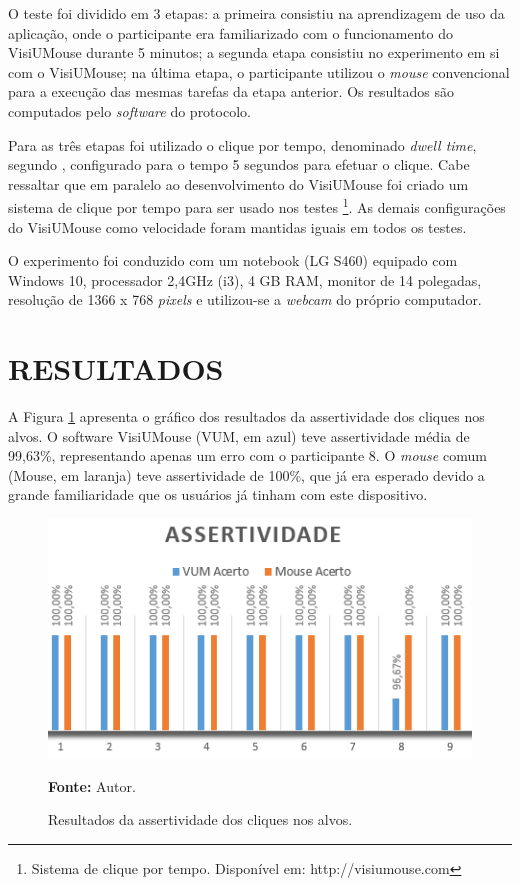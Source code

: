 O teste foi dividido em 3 etapas: a primeira consistiu na aprendizagem de uso da aplicação, onde o participante era familiarizado com o funcionamento do VisiUMouse durante 5 minutos; a segunda etapa consistiu no experimento em si com o VisiUMouse; na última etapa, o participante utilizou o \textit{mouse} convencional para a execução das mesmas tarefas da etapa anterior. Os resultados são computados pelo \textit{software} do protocolo.

Para as três etapas foi utilizado o clique por tempo, denominado \textit{dwell time}, segundo , configurado para o tempo 5 segundos para efetuar o clique. Cabe ressaltar que em paralelo ao desenvolvimento do VisiUMouse foi criado um sistema de clique por tempo para ser usado nos testes \footnote{Sistema de clique por tempo. Disponível em: http://visiumouse.com}. As demais configurações do VisiUMouse como velocidade foram mantidas iguais em todos os testes.  

O experimento foi conduzido com um notebook (LG S460) equipado com Windows 10, processador 2,4GHz (i3), 4 GB RAM, monitor de 14 polegadas, resolução de 1366 x 768 \textit{pixels} e utilizou-se a \textit{webcam} do próprio computador.

\section{RESULTADOS}\label{Sub:resultados-ex-1}
A Figura \ref{fig:assertividade} apresenta o gráfico dos resultados da assertividade dos cliques nos alvos. O software VisiUMouse (VUM, em azul) teve assertividade média de 99,63\%, representando apenas um erro com o participante 8. O \textit{mouse} comum (Mouse, em laranja) teve assertividade de 100\%, que já era esperado devido a grande familiaridade que os usuários já tinham com este dispositivo.

\begin{figure}[htbp]
\caption{Resultados da assertividade dos cliques nos alvos.} 
\centering \includegraphics[scale=1]{img/assertividade.png}

\textbf{Fonte:} Autor.
\label{fig:assertividade}
\end{figure}

